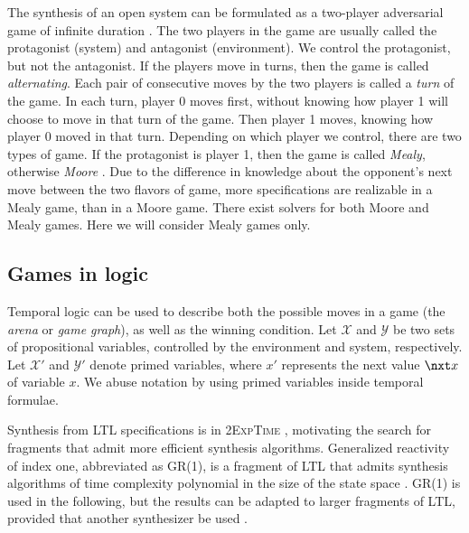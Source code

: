 \documentclass[copyright]{eptcs}
\begin{document}
The synthesis of an open system can be formulated as a two-player adversarial game of infinite duration \cite{Thomas08npgi}.
The two players in the game are usually called the protagonist (system) and antagonist (environment).
We control the protagonist, but not the antagonist.
If the players move in turns, then the game is called {\em alternating}.
Each pair of consecutive moves by the two players is called a {\em turn} of the game.
In each turn, player 0 moves first, without knowing how player 1 will choose to move in that turn of the game.
Then player 1 moves, knowing how player 0 moved in that turn.
Depending on which player we control, there are two types of game.
If the protagonist is player 1, then the game is called {\em Mealy}, otherwise {\em Moore}  \cite{Mealy55,Moore56}.
Due to the difference in knowledge about the opponent's next move between the two flavors of game, more specifications are realizable in a Mealy game, than in a Moore game.
There exist solvers for both Moore and Mealy games.
Here we will consider Mealy games only.


\subsection{Games in logic}
\label{sec:games-in-logic}

Temporal logic can be used to describe both the possible moves in a game (the {\em arena} or {\em game graph}), as well as the winning condition.
Let $\mathcal{X}$ and $\mathcal{Y}$ be two sets of propositional variables, controlled by the environment and system, respectively.
Let $\mathcal{X}'$ and $\mathcal{Y}'$ denote primed variables, where $x'$ represents the next value $\nxt x$ of variable $x$.
We abuse notation by using primed variables inside temporal formulae.

Synthesis from LTL specifications is in \textsc{2ExpTime} \cite{Pnueli89icalp,Rosner92}, motivating the search for fragments that admit more efficient synthesis algorithms.
Generalized reactivity of index one, abbreviated as GR(1), is a fragment of LTL that admits synthesis algorithms of time complexity polynomial in the size of the state space \cite{Bloem12jcss}.
GR(1) \cite{Jobstmann07cav,Pnueli10cav,Bloem10cav,Livingston12icra,Ehlers14synt} is used in the following, but the results can be adapted to larger fragments of LTL, provided that another synthesizer be used \cite{Jobstmann06fmcad,Ehlers11tacas,Ehlers2011wigp,Bohy12cav,Filippidis13list}.
\end{document}
